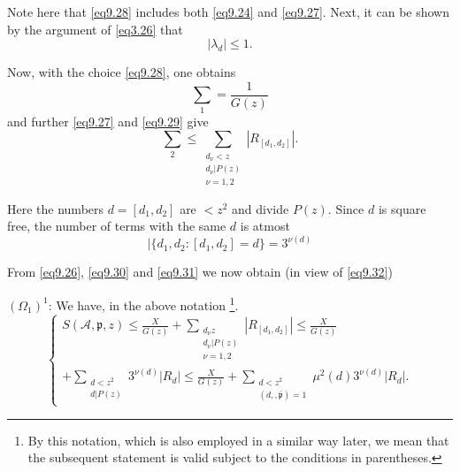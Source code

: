 Note here that \eqref{eq9.28} includes both \eqref{eq9.24} and
\eqref{eq9.27}. Next, it can be shown by the argument of
\eqref{eq3.26} that   
\begin{equation*}
|\lambda_d| \leq 1.\tag{9.29}\label{eq9.29}
\end{equation*}

Now, with the choice \eqref{eq9.28}, one obtains 
\begin{equation*}
\sum_1 = \frac{1}{G(z)}\tag{9.30}\label{eq9.30}
\end{equation*}
and further \eqref{eq9.27} and \eqref{eq9.29} give 
\begin{equation*}
\sum_2 \leq \sum_{\substack{d_{\nu}<z \\ {d_{\nu}|P(z) } \\ \nu = 1,2}}|
R_{[d_1,d_2]}|.\tag{9.31}\label{eq9.31} 
\end{equation*}

Here the numbers $d=[d_1,d_2]$ are $< z^2$ and divide $P(z)$. Since
$d$ is square free, the number of terms with the same $d$ is atmost  
\begin{equation*}
|\{d_1,d_2  : [d_1,d_2] = d \} = 3^{\nu (d)}\tag{9.32}\label{eq9.32}
\end{equation*}

From \eqref{eq9.26}, \eqref{eq9.30} and \eqref{eq9.31} we now obtain
(in view of \eqref{eq9.32}) 
 
\setcounter{section}{9}
\setcounter{theorem}{0}
\begin{theorem}\label{chap9-thm9.1}%
$(\Omega_1)^1$: We have, in the above notation \footnote{By this
    notation, which is also employed in a similar way later, we mean
    that the subsequent statement is valid subject to the conditions
    in parentheses.}. 
\begin{equation*}
\begin{cases}
S (\mathscr{A}, \mathfrak{p}, z)\leq \frac{X}{G(z)} +
\sum\limits_{\substack{d_{\nu} z \\ {d_{\nu}|P(z)  }\\{\nu=1,2}}}
|R_{[d_1,d_2]}| \leq \frac{X}{G(z)}\\
 +\sum \limits_{\substack{d< z^2
    \\ {d|P(z) }}}3^{\nu (d)}|R_d|\leq \frac{X}{G(z)} + \sum
\limits_{\substack{d <  z^2 \\ {(d,,\bar{\mathfrak{p}}) =1 }}}
\mu^2(d)3^{\nu (d)}|R_d|. 
\end{cases}\tag{9.33}\label{eq9.33} 
\end{equation*}
\end{theorem}

